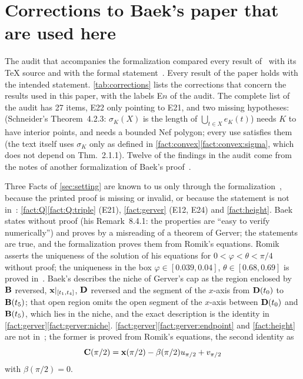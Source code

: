 \section{Corrections to Baek's paper that are used here}\label{app:corrections}

The audit that accompanies the formalization compared every result
of~\cite{Baek} with its TeX source and with the formal
statement~\cite{Companion}. Every result of the paper holds with the intended
statement. \cref{tab:corrections} lists the corrections that concern the results
used in this paper, with the labels E$n$ of the audit. The complete list of the
audit has 27 items, E22 only pointing to E21, and two missing hypotheses:
 (Schneider's Theorem~4.2.3: $\sigma_K(X)$ is the length of
$\bigcup_{t\in X}e_K(t)$) needs $K$ to have interior points, and
 needs a bounded Nef polygon; every use satisfies them (the
text itself uses $\sigma_K$ only as defined in
\cref{fact:convex}\ref{fact:convex:sigma}, which does not depend on Thm.~2.1.1).
Twelve of the findings in the audit come from the notes of another formalization
of Baek's proof~\cite{Cureton}.

Three Facts of \cref{sec:setting} are known to us only through the
formalization~\cite{Companion}, because the printed proof is missing or invalid,
or because the statement is not in~\cite{Baek}: \cref{fact:Q}\ref{fact:Q:triple}
(E21), \cref{fact:gerver} (E12, E24) and \cref{fact:height}. Baek states
 without proof (his Remark~8.4.1: the properties are ``easy to
verify numerically'') and proves  by a misreading of a theorem
of Gerver; the statements are true, and the formalization proves them from
Romik's equations. Romik asserts the uniqueness of the solution of his equations
for $0<\varphi<\theta<\pi/4$ without proof; the uniqueness in the box
$\varphi\in[0.039,0.04]$, $\theta\in[0.68,0.69]$ is proved in~\cite{Companion}.
Baek's  describes the niche of Gerver's cap as the region
enclosed by $\mathbf{B}$ reversed, $\mathbf{x}|_{[t_1,t_4]}$, $\mathbf{D}$ reversed and the segment
of the $x$-axis from $\mathbf{D}(t_0)$ to $\mathbf{B}(t_5)$; that open region omits the open
segment of the $x$-axis between $\mathbf{D}(t_0)$ and $\mathbf{B}(t_5)$, which lies in the
niche, and the exact description is the identity in
\cref{fact:gerver}\ref{fact:gerver:niche}.
\cref{fact:gerver}\ref{fact:gerver:endpoint} and \cref{fact:height} are not
in~\cite{Baek}; the former is proved from Romik's equations, the second identity
as
\[
  \mathbf{C}(\pi/2)=\mathbf{x}(\pi/2)-\beta(\pi/2)u_{\pi/2}+v_{\pi/2}
\]
with $\beta(\pi/2)=0$.


